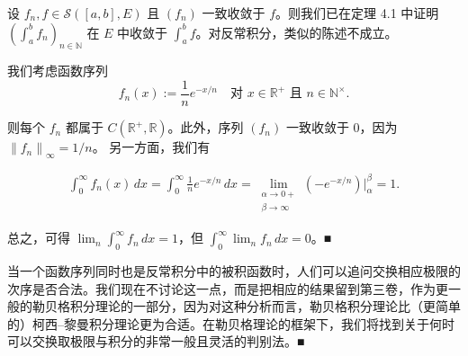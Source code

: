 \begin{remark}

\begin{items}
\item

设 $ f_{n}, f \in \mathcal{S}([a, b], E) $ 且 $ (f_{n}) $ 一致收敛于 $ f $。则我们已在定理 4.1 中证明 $ (\int_{a}^{b} f_{n})_{n \in \mathbb{N}} $ 在 $ E $ 中收敛于 $ \int_{a}^{b} f $。对反常积分，类似的陈述不成立。

\proofhead
我们考虑函数序列
\[
f_{n}(x) := \frac{1}{n} e^{-x/n} \quad \text{对 } x \in \mathbb{R}^{+} \text{ 且 } n \in \mathbb{N}^{\times} .
\]

则每个 $ f_{n} $ 都属于 $ C(\mathbb{R}^{+}, \mathbb{R}) $。此外，序列 $ (f_{n}) $ 一致收敛于 0，因为 $ \left\| f_{n} \right\|_{\infty} = 1/n $。
另一方面，我们有

\begin{equation*}
\begin{aligned}
\int_{0}^{\infty} f_{n}(x)\,dx = \int_{0}^{\infty} \frac{1}{n} e^{-x/n}\,dx = \lim_{\substack{\alpha \to 0+ \\ \beta \to \infty}} \left( -e^{-x/n} \right) \Big|_{\alpha}^{\beta} = 1 .
\end{aligned}
\end{equation*}

总之，可得 $ \lim_{n} \int_{0}^{\infty} f_{n}\,dx = 1 $，但 $ \int_{0}^{\infty} \lim_{n} f_{n}\,dx = 0 $。\nobreak\hspace{0.35em}■

\item

当一个函数序列同时也是反常积分中的被积函数时，人们可以追问交换相应极限的次序是否合法。我们现在不讨论这一点，而是把相应的结果留到第三卷，作为更一般的勒贝格积分理论的一部分，因为对这种分析而言，勒贝格积分理论比（更简单的）柯西–黎曼积分理论更为合适。在勒贝格理论的框架下，我们将找到关于何时可以交换取极限与积分的非常一般且灵活的判别法。\nobreak\hspace{0.35em}■

\end{items}

\end{remark}

\exerciseshead

